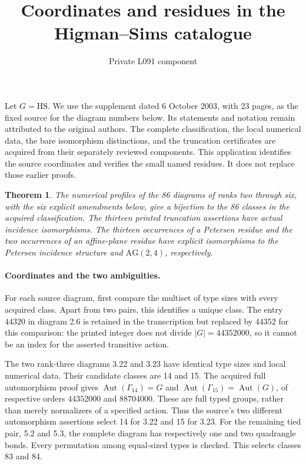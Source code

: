 \documentclass[10pt]{article}
\title{Coordinates and residues in the Higman--Sims catalogue}
\author{Private L091 component}\date{}
\newtheorem{theorem}{Theorem}
\begin{document}
\maketitle
Let $G=\mathrm{HS}$. We use the supplement dated 6 October 2003,
with 23 pages, as the fixed source for the diagram numbers below.
Its statements and notation remain attributed to the original authors.
The complete classification, the local numerical data, the bare
isomorphism distinctions, and the truncation certificates are acquired
from their separately reviewed components. This application identifies
the source coordinates and verifies the small named residues. It does
not replace those earlier proofs.

\begin{theorem}
The numerical profiles of the 86 diagrams of ranks two through six,
with the six explicit amendments below, give a bijection to the 86
classes in the acquired classification. The thirteen printed truncation
assertions have actual incidence isomorphisms. The thirteen occurrences
of a Petersen residue and the two occurrences of an affine-plane residue
have explicit isomorphisms to the Petersen incidence structure and
$\mathrm{AG}(2,4)$, respectively.
\end{theorem}

\paragraph{Coordinates and the two ambiguities.}
For each source diagram, first compare the multiset of type sizes with
every acquired class. Apart from two pairs, this identifies a unique
class. The entry $44320$ in diagram 2.6 is retained in the transcription
but replaced by $44352$ for this comparison: the printed integer does
not divide $|G|=44352000$, so it cannot be an index for the asserted
transitive action.

The two rank-three diagrams 3.22 and 3.23 have identical type sizes and
local numerical data. Their candidate classes are 14 and 15. The acquired
full automorphism proof gives $\operatorname{Aut}(\Gamma_{14})=G$ and
$\operatorname{Aut}(\Gamma_{15})=\operatorname{Aut}(G)$, of respective
orders $44352000$ and $88704000$. These are full typed groups, rather
than merely normalizers of a specified action. Thus the source's two
different automorphism assertions select 14 for 3.22 and 15 for 3.23.
For the remaining tied pair, 5.2 and 5.3, the complete diagram has
respectively one and two quadrangle bonds. Every permutation among
equal-sized types is checked. This selects classes 83 and 84.
\end{document}
